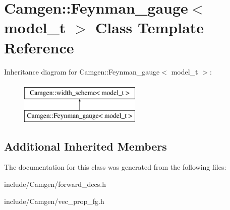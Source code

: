 \hypertarget{a00225}{}\section{Camgen\+:\+:Feynman\+\_\+gauge$<$ model\+\_\+t $>$ Class Template Reference}
\label{a00225}
Inheritance diagram for Camgen\+:\+:Feynman\+\_\+gauge$<$ model\+\_\+t $>$\+:\begin{figure}[H]
\begin{center}
\leavevmode
\includegraphics[height=2.000000cm]{a00225}
\end{center}
\end{figure}
\subsection*{Additional Inherited Members}


The documentation for this class was generated from the following files\+:\begin{DoxyCompactItemize}
\item 
include/\+Camgen/forward\+\_\+decs.\+h\item 
include/\+Camgen/vec\+\_\+prop\+\_\+fg.\+h\end{DoxyCompactItemize}
